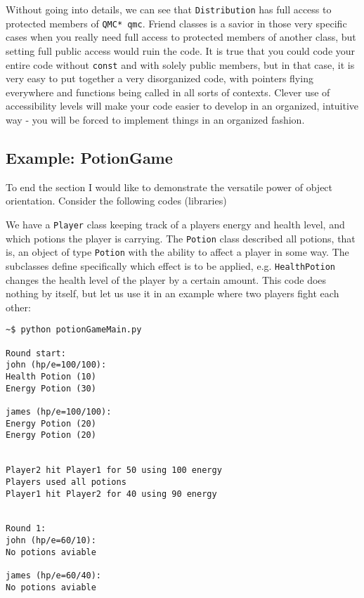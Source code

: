 Without going into details, we can see that \verb+Distribution+ has full access to protected members of \verb+QMC* qmc+. Friend classes is a savior in those very specific cases when you really need full access to protected members of another class, but setting full public access would ruin the code. It is true that you could code your entire code without \verb+const+ and with solely public members, but in that case, it is very easy to put together a very disorganized code, with pointers flying everywhere and functions being called in all sorts of contexts. Clever use of accessibility levels will make your code easier to develop in an organized, intuitive way - you will be forced to implement things in an organized fashion.


\subsection{Example: PotionGame}

To end the section I would like to demonstrate the versatile power of object orientation. Consider the following codes (libraries)

\vspace{0.5 cm}



We have a \verb+Player+ class keeping track of a players energy and health level, and which potions the player is carrying. The \verb+Potion+ class described all potions, that is, an object of type \verb+Potion+ with the ability to affect a player in some way. The subclasses define specifically which effect is to be applied, e.g. \verb+HealthPotion+ changes the health level of the player by a certain amount. This code does nothing by itself, but let us use it in an example where two players fight each other:

\vspace{0.5 cm}


\begin{verbatim}
~$ python potionGameMain.py 

Round start: 
john (hp/e=100/100):
Health Potion (10)
Energy Potion (30)

james (hp/e=100/100):
Energy Potion (20)
Energy Potion (20)


Player2 hit Player1 for 50 using 100 energy
Players used all potions
Player1 hit Player2 for 40 using 90 energy


Round 1: 
john (hp/e=60/10):
No potions aviable

james (hp/e=60/40):
No potions aviable

\end{verbatim}



